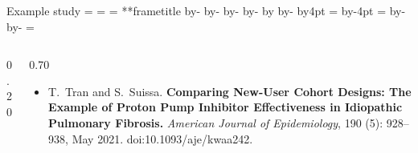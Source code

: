 \documentclass[aspectratio=169,12pt]{beamer} %
\makeatletter
\newif\ifsidebartheme
\newcommand*{\calculatespace}{%
    \contentheight=\paperheight%
    \ifx\beamer@frametitle\@empty%
        \setbox\@tempboxa=\box\voidb@x%
      \else%
        \setbox\@tempboxa=\vbox{%
          \vbox{}%
          {\parskip0pt\usebeamertemplate***{frametitle}}%
        }%
        \ifsidebartheme%
          \advance\contentheight by-1em%
        \fi%
      \fi%
    \advance\contentheight by-\ht\@tempboxa%
    \advance\contentheight by-\dp\@tempboxa%
    \advance\contentheight by-\beamer@frametopskip%
    \ifbeamer@plainframe%
    \contentbottom=0pt%
    \else%
    \advance\contentheight by-\headheight%
    \advance\contentheight by\headdp%
    \advance\contentheight by-\footheight%
    \advance\contentheight by4pt%
    \contentbottom=\footheight%
    \advance\contentbottom by-4pt%
    \fi%
    \contentwidth=\paperwidth%
    \ifbeamer@plainframe%
    \contentleft=0pt%
    \else%
    \advance\contentwidth by-\beamer@rightsidebar%
    \advance\contentwidth by-\beamer@leftsidebar\relax%
    \contentleft=\beamer@leftsidebar%
    \fi%
}
\makeatother
\begin{document}
\begin{frame}{Example study}
\calculatespace%
\begin{columns}
\begin{column}{0.20\contentwidth}
\end{column}
\begin{column}{0.70\contentwidth}
	\begin{itemize}
		\item T.~Tran and S.~Suissa. \textbf{Comparing {New}-{User} {Cohort} {Designs}: {The} {Example} of {Proton} {Pump} {Inhibitor} {Effectiveness} in {Idiopathic} {Pulmonary} {Fibrosis}.} \emph{American Journal of Epidemiology}, 190 (5): 928--938, May 2021. doi:10.1093/aje/kwaa242.
\nocite{tran_comparing_2021}
	\end{itemize}
\end{column}
\end{columns}
\end{frame}
\end{document}
